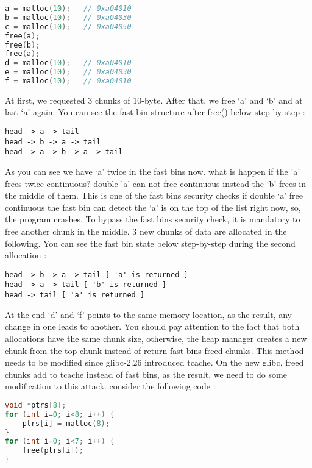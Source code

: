 \documentclass{masterthesis}
\newcommand*\libc{glibc}
\begin{document}
\begin{lstlisting}[language=c,frame=tlrb]
a = malloc(10);   // 0xa04010
b = malloc(10);   // 0xa04030
c = malloc(10);   // 0xa04050
free(a);
free(b); 
free(a);
d = malloc(10);   // 0xa04010
e = malloc(10);   // 0xa04030
f = malloc(10);   // 0xa04010
\end{lstlisting}

At first, we requested 3 chunks of 10-byte. After that, we free ‘a’ and ‘b’ and at last ‘a' again. You can see the fast bin structure after free() below step by step :

\begin{lstlisting}[frame=tlrb]
head -> a -> tail
head -> b -> a -> tail
head -> a -> b -> a -> tail
\end{lstlisting}

As you can see we have ‘a’ twice in the fast bins now. what is happen if the 'a' frees twice continuous? double 'a' can not free continuous instead the ‘b’ frees in the middle of them. This is one of the fast bins security checks if double ‘a’ free continuous the fast bin can detect the ‘a’ is on the top of the list right now, so, the program crashes. To bypass the fast bins security check, it is mandatory to free another chunk in the middle. 3 new chunks of data are allocated in the following. You can see the fast bin state below step-by-step during the second allocation :

\begin{lstlisting}[frame=tlrb]
head -> b -> a -> tail [ 'a' is returned ]
head -> a -> tail [ 'b' is returned ]
head -> tail [ 'a' is returned ]
\end{lstlisting}

At the end ‘d’ and ‘f’ points to the same memory location, as the result, any change in one leads to another. You should pay attention to the fact that both allocations have the same chunk size, otherwise, the heap manager creates a new chunk from the top chunk instead of return fast bins freed chunks.
This method needs to be modified since \libc{-2.26} introduced tcache. On the new \libc{}, freed chunks add to tcache instead of fast bins, as the result, we need to do some modification to this attack. consider the following code :

\begin{lstlisting}[language=c,frame=tlrb]
void *ptrs[8];
for (int i=0; i<8; i++) {
	ptrs[i] = malloc(8);
}
for (int i=0; i<7; i++) {
	free(ptrs[i]);
}
\end{lstlisting}
\end{document}
